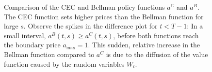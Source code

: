\documentclass[main.tex]{subfiles}
\begin{document}
\begin{figure}[p]
  \vspace{1em}
  \caption{Comparison of the CEC and Bellman policy functions $a^C$ and
    $a^B$.
    The CEC function sets
    higher prices than the Bellman function for large $s$.
    Observe the spikes in the difference plot for $t<T-1$:
    In a small interval, $a^B(t,s)\geq a^C(t,s)$, before both functions
    reach the boundary price $a_{\mathrm{max}}=1$. This sudden, relative increase in
    the Bellman function compared to $a^C$ is due to the
    diffusion of the value function caused by the
    random variables $W_t$.
  }\label{fig:bellman_det_policy_difference}
\end{figure}
\end{document}
